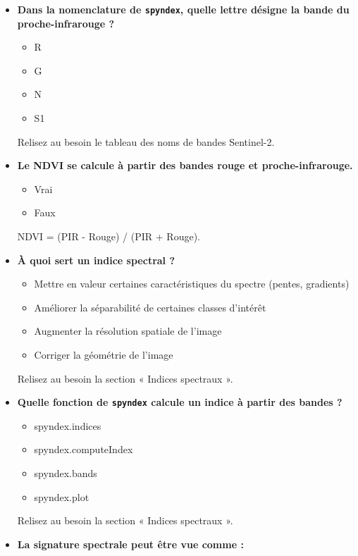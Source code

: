 \documentclass[
  french,
  11pt,
  letterpaper,
  open=any,
  twoside=false,
  french]{scrbook}
\providecommand{\tightlist}{%
  \setlength{\itemsep}{0pt}\setlength{\parskip}{0pt}}
\begin{document}
\begin{itemize}
  Relisez au besoin la section « Indices spectraux ».
\item
  \textbf{Dans la nomenclature de \texttt{spyndex}, quelle lettre
  désigne la bande du proche-infrarouge ?}

  \begin{itemize}
  \tightlist
  \item
    R
  \item
    G
  \item
    N
  \item
    S1
  \end{itemize}

  Relisez au besoin le tableau des noms de bandes Sentinel-2.
\item
  \textbf{Le NDVI se calcule à partir des bandes rouge et
  proche-infrarouge.}

  \begin{itemize}
  \tightlist
  \item
    Vrai
  \item
    Faux
  \end{itemize}

  NDVI = (PIR - Rouge) / (PIR + Rouge).
\item
  \textbf{À quoi sert un indice spectral ?}

  \begin{itemize}
  \tightlist
  \item
    Mettre en valeur certaines caractéristiques du spectre (pentes,
    gradients)
  \item
    Améliorer la séparabilité de certaines classes d'intérêt
  \item
    Augmenter la résolution spatiale de l'image
  \item
    Corriger la géométrie de l'image
  \end{itemize}

  Relisez au besoin la section « Indices spectraux ».
\item
  \textbf{Quelle fonction de \texttt{spyndex} calcule un indice à partir
  des bandes ?}

  \begin{itemize}
  \tightlist
  \item
    spyndex.indices
  \item
    spyndex.computeIndex
  \item
    spyndex.bands
  \item
    spyndex.plot
  \end{itemize}

  Relisez au besoin la section « Indices spectraux ».
\item
  \textbf{La signature spectrale peut être vue comme :}


\end{itemize}
\end{document}
